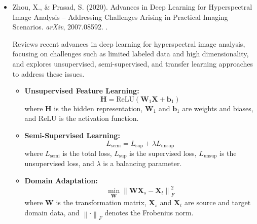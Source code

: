 \documentclass[10pt,svgnames,fragile]{beamer}
\begin{document}
\begin{frame}
\tiny
\begin{itemize}

    \item Zhou, X., \& Prasad, S. (2020). Advances in Deep Learning for Hyperspectral Image Analysis – Addressing Challenges Arising in Practical Imaging Scenarios. \textit{arXiv}, 2007.08592. \href{https://arxiv.org/abs/2007.08592}{\color{blue}{arXiv:2007.08592}}. \cite{zhouAdvancesDeepLearning2020}

    {\color{gray}Reviews recent advances in deep learning for hyperspectral image analysis, focusing on challenges such as limited labeled data and high dimensionality, and explores unsupervised, semi-supervised, and transfer learning approaches to address these issues.}
    \begin{itemize} \tiny
    \item \textbf{Unsupervised Feature Learning:}
    \[
    \mathbf{H} = \text{ReLU}(\mathbf{W}_1 \mathbf{X} + \mathbf{b}_1)
    \]
    where \( \mathbf{H} \) is the hidden representation, \( \mathbf{W}_1 \) and \( \mathbf{b}_1 \) are weights and biases, and \(\text{ReLU}\) is the activation function.

    \item \textbf{Semi-Supervised Learning:}
    \[
    L_{\text{semi}} = L_{\text{sup}} + \lambda L_{\text{unsup}}
    \]
    where \( L_{\text{semi}} \) is the total loss, \( L_{\text{sup}} \) is the supervised loss, \( L_{\text{unsup}} \) is the unsupervised loss, and \( \lambda \) is a balancing parameter.

    \item \textbf{Domain Adaptation:}
    \[
    \min_{\mathbf{W}} \left\| \mathbf{W} \mathbf{X}_s - \mathbf{X}_t \right\|^2_F
    \]
    where \( \mathbf{W} \) is the transformation matrix, \( \mathbf{X}_s \) and \( \mathbf{X}_t \) are source and target domain data, and \( \left\| \cdot \right\|_F \) denotes the Frobenius norm.
    \end{itemize}

\end{itemize}
\end{frame}
\end{document}
